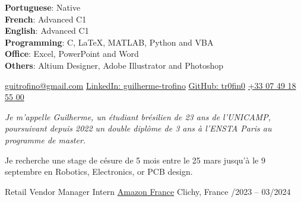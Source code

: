 \documentclass[10pt, a4paper]{extarticle}
\newcommand{\areaofinterest}{Robotics, Electronics, or PCB design}
\begin{document}
\vspace{6mm}
\begin{multicols}{2}
    \vspace{2mm}
    \textbf{Portuguese}: Native\\
    \textbf{French}: Advanced C1\\
    \textbf{English}: Advanced C1\\
    \columnbreak
    \vspace{2mm}
    \textbf{Programming}: C, LaTeX, MATLAB, Python and VBA\\
    \textbf{Office}: Excel, PowerPoint and Word\\
    \textbf{Others}: Altium Designer, Adobe Illustrator and Photoshop\\
\end{multicols}



\newpage
{}

\noindent\href{mailto:guitrofino@gmail.com}{guitrofino@gmail.com}
\qquad\href{https://www.linkedin.com/in/guilherme-trofino/}{LinkedIn: guilherme-trofino}
\qquad\href{https://github.com/tr0fin0}{GitHub: tr0fin0}
\qquad\href{tel:+330749185500}{+33 07 49 18 55 00}


\begin{multicols}{2}
\noindent \textit{Je m'appelle Guilherme, un étudiant brésilien de 23 ans de l'UNICAMP, poursuivant depuis 2022 un double diplôme de 3 ans à l'ENSTA Paris au programme de master.}

\columnbreak

\noindent Je recherche une stage de césure de 5 mois entre le 25 mars jusqu'à le 9 septembre en \areaofinterest.
\end{multicols}


\headedsection
    {Retail Vendor Manager Intern}
    {}
    {
        \headedsubsection
        {\href{https://www.aboutamazon.fr/}{Amazon France}}
        {Clichy, France /2023 -- 03/2024}
        {}
    }
\end{document}
